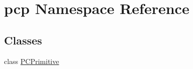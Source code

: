 \hypertarget{namespacepcp}{\section{pcp Namespace Reference}
\label{namespacepcp}
}
\subsection*{Classes}
\begin{DoxyCompactItemize}
\item 
class \hyperlink{classpcp_1_1PCPrimitive}{P\-C\-Primitive}
\end{DoxyCompactItemize}
